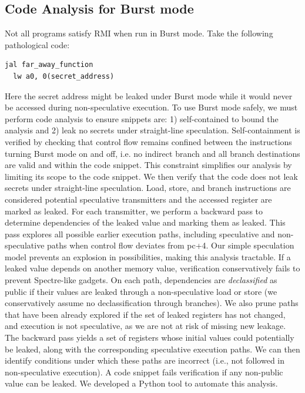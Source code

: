 \subsection{Code Analysis for Burst mode}
Not all programs satisfy RMI when run in Burst mode. Take the following pathological code:
\noindent\begin{minipage}[]{0.25\textwidth}
\begin{lstlisting}[language={[RISC-V]Assembler}]
  jal far_away_function
  lw a0, 0(secret_address)
\end{lstlisting}
\end{minipage}
Here the secret address might be leaked under Burst mode while it would never be accessed during non-speculative execution.
To use Burst mode safely, we must perform code analysis to ensure snippets are: 1) self-contained to bound the analysis and 2) leak no secrets under straight-line speculation.
Self-containment is verified by checking that control flow remains confined between the instructions turning Burst mode on and off, i.e. no indirect branch and all branch destinations are valid and within the code snippet.
This constraint simplifies our analysis by limiting its scope to the code snippet.
We then verify that the code does not leak secrets under straight-line speculation.
Load, store, and branch instructions are considered potential speculative transmitters and the accessed register are marked as leaked.
For each transmitter, we perform a backward pass to determine dependencies of the leaked value and marking them as leaked.
This pass explores all possible earlier execution paths, including speculative and non-speculative paths when control flow deviates from pc+4.
Our simple speculation model prevents an explosion in possibilities, making this analysis tractable.
If a leaked value depends on another memory value, verification conservatively fails to prevent Spectre-like gadgets.
On each path, dependencies are \emph{declassified} as public if their values are leaked through a non-speculative load or store (we conservatively assume no declassification through branches).
We also prune paths that have been already explored if the set of leaked registers has not changed, and execution is not speculative, as we are not at risk of missing new leakage.
The backward pass yields a set of registers whose initial values could potentially be leaked, along with the corresponding speculative execution paths.
We can then identify conditions under which these paths are incorrect (i.e., not followed in non-speculative execution).
A code snippet fails verification if any non-public value can be leaked.
We developed a Python tool to automate this analysis.

